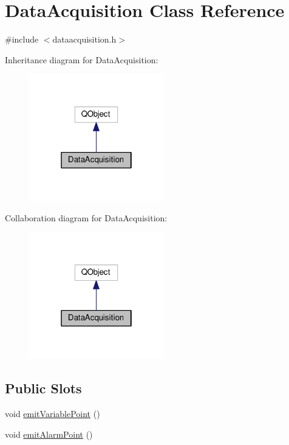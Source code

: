 \hypertarget{class_data_acquisition}{}\section{Data\+Acquisition Class Reference}
\label{class_data_acquisition}


{\ttfamily \#include $<$dataacquisition.\+h$>$}



Inheritance diagram for Data\+Acquisition\+:
\nopagebreak
\begin{figure}[H]
\begin{center}
\leavevmode
\includegraphics[width=166pt]{class_data_acquisition__inherit__graph}
\end{center}
\end{figure}


Collaboration diagram for Data\+Acquisition\+:
\nopagebreak
\begin{figure}[H]
\begin{center}
\leavevmode
\includegraphics[width=166pt]{class_data_acquisition__coll__graph}
\end{center}
\end{figure}
\subsection*{Public Slots}
\begin{DoxyCompactItemize}
\item 
void \hyperlink{class_data_acquisition_a45cde4da4b49df1efb70782d6fbad567}{emit\+Variable\+Point} ()
\item 
void \hyperlink{class_data_acquisition_aaade9e60ad304258f5e92ee7fd861461}{emit\+Alarm\+Point} ()
\end{DoxyCompactItemize}
